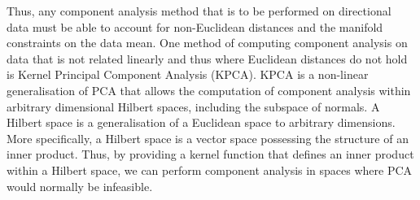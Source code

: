 \begin{figure}[t]
\begin{minipage}[t]{.45\textwidth}
\label{fig:singl_img_united_nations}
	\end{minipage}
\end{figure}
Thus, any component analysis method that is to be performed on directional data
must be able to account for non-Euclidean distances and the manifold constraints
on the data mean. One method of computing component analysis on data that is
not related linearly and thus where Euclidean distances do not hold is
Kernel Principal Component Analysis (KPCA).
KPCA is a non-linear generalisation of PCA that allows the computation
of component analysis within arbitrary dimensional Hilbert spaces,
including the subspace of normals. A Hilbert space is a generalisation
of a Euclidean space to arbitrary dimensions. More specifically, a Hilbert
space is a vector space possessing the structure of an inner
product. Thus, by providing a kernel function that defines
an inner product within a Hilbert space, we can perform component analysis in
spaces where PCA would normally be infeasible.


